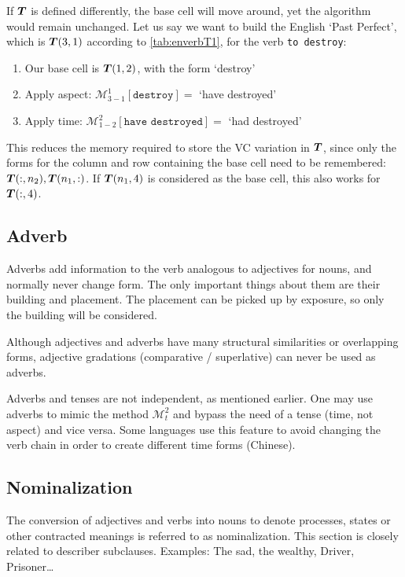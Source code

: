 If $\boldsymbol{T}$ is defined differently, the base cell will move around, yet the algorithm would remain unchanged.  Let us say we want to build  the English `Past Perfect', which is $\boldsymbol{T}(3,1)$ according to \autoref{tab:enverbT1}, for the verb \texttt{to destroy}:
\begin{example}
    \begin{enumerate}
    \item Our base cell is $\boldsymbol{T}(1,2)$, with the form `destroy' 
    \item Apply  aspect: $\mathcal{M}^{1}_{3-1}[\texttt{destroy}]=$ `have destroyed'
    \item Apply time: $\mathcal{M}^{2}_{1-2}[\texttt{have destroyed}]=$ `had destroyed'
    \end{enumerate}
\end{example}
This reduces the memory required to store the VC variation in $\boldsymbol{T}$, since only the  forms for the column and row  containing  the base cell need to be remembered: $\boldsymbol{T}(:,n_2), \boldsymbol{T}(n_1,:)$. If  $\boldsymbol{T}(n_1,4)$ is considered as the base cell, this also works for $\boldsymbol{T}(:,4)$.
\subsection{Adverb}
Adverbs add information to the verb analogous to adjectives for nouns, and normally never change form. The only important things about them are their building and placement. The placement can be picked up by exposure, so only the building will be considered. 

Although adjectives and adverbs have many structural similarities or overlapping forms,  adjective gradations (comparative / superlative) can never be used as adverbs. 

Adverbs and tenses are not independent, as mentioned earlier. One may use adverbs to mimic the method $\mathcal{M}^{2}_{t}$ and bypass the need of a tense (time, not aspect) and vice versa. Some languages use this feature to avoid changing the verb chain in order to create different  time forms (Chinese).
\subsection{Nominalization}
The conversion of adjectives and verbs into nouns to denote processes, states or other contracted meanings is referred to as nominalization. This section is closely related to describer subclauses. Examples: The sad, the wealthy, Driver, Prisoner\ldots

